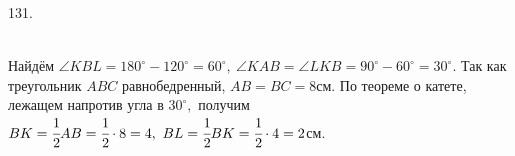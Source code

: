131. \begin{figure}[ht!]
\end{figure}\\
Найдём $\angle KBL=180^\circ-120^\circ=60^\circ,\ \angle KAB=\angle LKB=90^\circ-60^\circ=30^\circ.$ Так как треугольник $ABC$ равнобедренный, $AB=BC=8$см. По теореме о катете, лежащем напротив угла в $30^\circ,$ получим $BK=\cfrac{1}{2}AB=\cfrac{1}{2}\cdot8=4,\ BL=\cfrac{1}{2}BK=\cfrac{1}{2}\cdot4=2$см.\newpage\noindent
